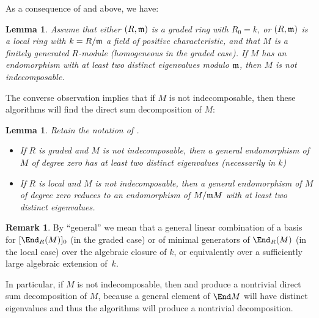 \documentclass[12pt]{article}
\theoremstyle{theorem}
\numberwithin{thm}{section}
\newtheorem{lem}[thm]{Lemma}
\theoremstyle{definition}
\newtheorem{rem}[thm]{Remark}
\begin{document}
As a consequence of  and  above, we have:

\begin{lem}\label{lem:term}
  Assume that either $(R,\mathfrak m)$ is a graded ring with $R_0=k$, or $(R,\mathfrak m)$ is a local ring with $k=R/\mathfrak m$ a field of positive characteristic, and that $M$ is a finitely generated $R$-module (homogeneous in the graded case).
  If $M$ has an endomorphism with at least two distinct eigenvalues modulo $\mathfrak m$, then $M$ is not indecomposable.
\end{lem}

The converse observation implies that if $M$ is not indecomposable, then these algorithms will find the direct sum decomposition of $M$:

\begin{lem}\label{lem:distinct}
  Retain the notation of .
  \begin{itemize}
  \item If $R$ is graded and $M$ is not indecomposable, then a general endomorphism of $M$ of degree zero has at least two distinct eigenvalues (necessarily in $k$)
  \item If $R$ is local and $M$ is not indecomposable, then a general endomorphism of $M$ of degree zero reduces to an endomorphism of $M/\mathfrak m M$ with at least two distinct eigenvalues.
  \end{itemize}
\end{lem}

\begin{rem}
  By ``general'' we mean that a general linear combination of a basis for $[\End_R(M)]_0$ (in the graded case) or of minimal generators of $\End_R(M)$ (in the local case) over the algebraic closure of $k$, or equivalently over a sufficiently large algebraic extension of~$k$.
\end{rem}



In particular, if $M$ is not indecomposable, then  and  produce a nontrivial direct sum decomposition of $M$, because a general element of $\End M$ will have distinct eigenvalues and thus the algorithms will produce a nontrivial decomposition.
\end{document}

